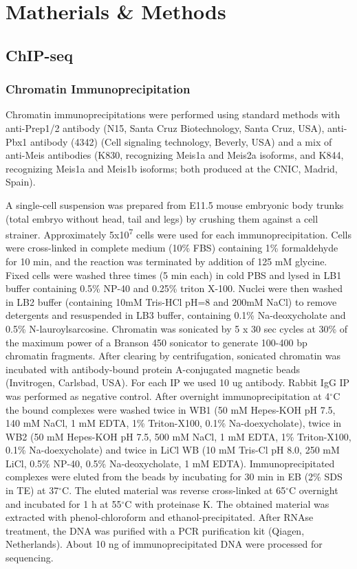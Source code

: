 \chapter{Matherials \& Methods}
\label{chp:methods}

\section{ChIP-seq}
\subsection{Chromatin Immunoprecipitation}

Chromatin immunoprecipitations were performed using standard methods with anti-Prep1/2 antibody (N15, Santa Cruz Biotechnology, Santa Cruz, USA), anti-Pbx1 antibody (4342) (Cell signaling technology, Beverly, USA) and a mix of anti-Meis antibodies (K830, recognizing Meis1a and Meis2a isoforms, and K844, recognizing Meis1a and Meis1b isoforms; both produced at the CNIC, Madrid, Spain).

A single-cell suspension was prepared from E11.5 mouse embryonic body trunks (total embryo without head, tail and legs) by crushing them against a cell strainer. Approximately 5x10\textsuperscript{7} cells were used for each immunoprecipitation. Cells were cross-linked in complete medium (10\% FBS) containing 1\% formaldehyde for 10 min, and the reaction was terminated by addition of 125 mM glycine. Fixed cells were washed three times (5 min each) in cold PBS and lysed in LB1 buffer containing 0.5\% NP-40 and 0.25\% triton X-100. Nuclei were then washed in LB2 buffer (containing 10mM Tris-HCl pH=8 and 200mM NaCl) to remove detergents and resuspended in LB3 buffer, containing 0.1\% Na-deoxycholate and 0.5\% N-lauroylsarcosine. Chromatin was sonicated by 5 x 30 sec cycles at 30\% of the maximum power of a Branson 450 sonicator to generate 100-400 bp chromatin fragments. After clearing by centrifugation, sonicated chromatin was incubated with antibody-bound protein A-conjugated magnetic beads (Invitrogen, Carlsbad, USA). For each IP we used 10 ug antibody. Rabbit IgG IP was performed as negative control. After overnight immunoprecipitation at 4$^\circ$C the bound complexes were washed twice in WB1 (50 mM Hepes-KOH pH 7.5, 140 mM NaCl, 1 mM EDTA, 1\% Triton-X100, 0.1\% Na-doexycholate), twice in WB2 (50 mM Hepes-KOH pH 7.5, 500 mM NaCl, 1 mM EDTA, 1\% Triton-X100, 0.1\% Na-doexycholate) and twice in LiCl WB (10 mM Tris-Cl pH 8.0, 250 mM LiCl, 0.5\% NP-40, 0.5\% Na-deoxycholate, 1 mM EDTA). Immunoprecipitated complexes were eluted from the beads by incubating for 30 min in EB (2\% SDS in TE) at 37$^\circ$C. The eluted material was reverse cross-linked at 65$^\circ$C overnight and incubated for 1 h at 55$^\circ$C with proteinase K. The obtained material was extracted with phenol-chloroform and ethanol-precipitated. After RNAse treatment, the DNA was purified with a \ac{PCR} purification kit (Qiagen, Netherlands). About 10 ng of immunoprecipitated DNA were processed for sequencing.

